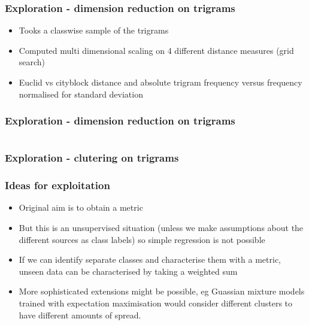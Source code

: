 \documentclass{beamer}
\begin{document}
\begin{frame}
  \frametitle{Exploration - dimension reduction on trigrams}
  \begin{itemize}
    \item Tooks a classwise sample of the trigrams\pause{}
    \item Computed multi dimensional scaling on 4 different distance measures (grid search)\pause{}
    \item Euclid vs cityblock distance and absolute trigram frequency versus frequency normalised for standard deviation
  \end{itemize}
\end{frame}

\begin{frame}
  \frametitle{Exploration - dimension reduction on trigrams}
  \begin{columns}[t]
    \begin{column}{0.5\textwidth}
      \vspace{-3em}
      
      \vspace{-3.5em}
      
    \end{column}
    \begin{column}{0.5\textwidth}
      \vspace{-3em}
      
      \vspace{-3em}
      
    \end{column}
  \end{columns}
\end{frame}

\begin{frame}
  \frametitle{Exploration - clutering on trigrams}

\end{frame}

\begin{frame}
  \frametitle{Ideas for exploitation}
  \begin{itemize}
    \item Original aim is to obtain a metric\pause{}

    \item But this is an unsupervised situation (unless we make assumptions
      about the different sources as class labels) so simple regression is not
      possible\pause{}

    \item If we can identify separate classes and characterise them with a
      metric, unseen data can be characterised by taking a weighted sum\pause{}

    \item More sophisticated extensions might be possible, eg Guassian mixture
      models trained with expectation maximisation would consider different
      clusters to have different amounts of spread.
  \end{itemize}
\end{frame}
\end{document}

